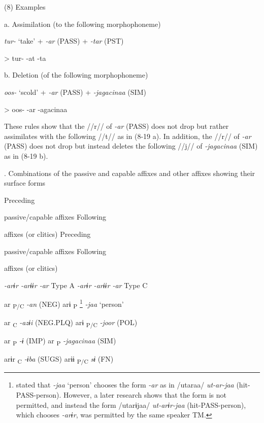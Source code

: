 (8)  Examples

  a.  Assimilation (to the following morphophoneme)

      \textit{tur-}  ‘take’  +  \textit{{}-ar} (PASS)  +  \textit{{}-tar} (PST)

    >  tur-      {}-at      {}-ta  

  b.  Deletion (of the following morphophoneme)

      \textit{oos-}  ‘scold’  +  \textit{{}-ar} (PASS)  +  \textit{{}-jagacinaa} (SIM)

    >  oos-      {}-ar      {}-agacinaa  

These rules show that the //r// of \textit{{}-ar} (PASS) does not drop but rather assimilates with the following //t// as in (8-19 a). In addition, the //r// of \textit{{}-ar} (PASS) does not drop but instead deletes the following //j// of \textit{{}-jagacinaa} (SIM) as in (8-19 b).

\begin{styleBeschriftung}
\textmd{. Combinations of the passive and capable affixes and other affixes showing their surface forms}
\end{styleBeschriftung}

Preceding

passive/capable affixes  Following

affixes (or clitics)    Preceding

passive/capable affixes  Following

affixes (or clitics)

\textit{{}-arɨr  {}-arɨɨr  {}-ar} Type A    \textit{{}-arɨr  {}-arɨɨr  {}-ar} Type C

    ar\textsubscript{ P/C}  \textit{{}-an} (NEG)    arɨ\textsubscript{ P}\textstyleFootnoteSymbol{} \footnote{\citet[70]{Niinaga2010} stated that \textit{{}-jaa} ‘person’ chooses the form \textit{{}-ar} as in /utaraa/ \textit{ut-ar-jaa} (hit-PASS-person). However, a later research shows that the form is not permitted, and instead the form /utarɨjaa/ \textit{ut-arɨr-jaa} (hit-PASS-person), which chooses \textit{{}-arɨr}, was permitted by the same speaker TM.}      \textit{{}-jaa} ‘person’

    ar\textsubscript{ C}  \textit{{}-azɨi} (NEG.PLQ)    arɨ\textsubscript{ P/C}      \textit{{}-joor} (POL)

    ar \textsubscript{P}  \textit{{}-ɨ} (IMP)        ar\textsubscript{ P}  \textit{{}-jagacinaa} (SIM)

arɨr\textsubscript{ C}      \textit{{}-ɨba} (SUGS)      arɨɨ\textsubscript{ P/C}    \textit{sɨ}  (FN)

